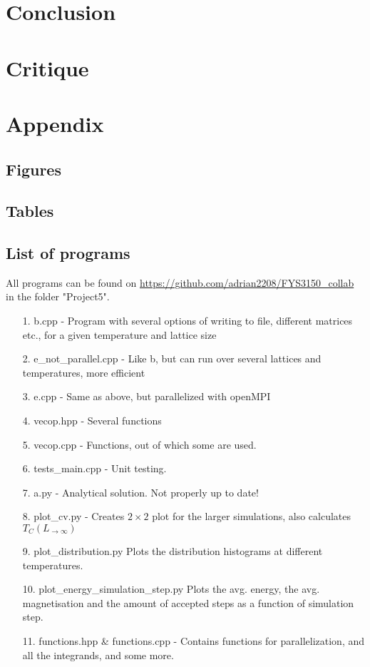 \documentclass[10pt,a4paper]{article}
\begin{document}
\section{Conclusion}

\section{Critique}

\section{Appendix}
\subsection{Figures}

\subsection{Tables}

\subsection{List of programs}
All programs can be found on \url{https://github.com/adrian2208/FYS3150_collab} in the folder "Project5".


\begin{itemize}
\item[1.] b.cpp - Program with several options of writing to file, different matrices etc., for a given temperature and lattice size
\item[2.] e\_not\_parallel.cpp - Like b, but can run over several lattices and temperatures, more efficient
\item[3.] e.cpp - Same as above, but parallelized with openMPI
\item[4.] vecop.hpp - Several functions
\item[5.] vecop.cpp - Functions, out of which some are used.
\item[6.] tests\_main.cpp - Unit testing.
\item[7.] a.py - Analytical solution. Not properly up to date!
\item[8.] plot\_cv.py - Creates $2\times2$ plot for the larger simulations, also calculates $T_C(L_{\rightarrow \infty})$
\item[9.] plot\_distribution.py Plots the distribution histograms at different temperatures.
\item[10.] plot\_energy\_simulation\_step.py Plots the  avg. energy, the avg. magnetisation and the amount of accepted steps as a function of simulation step.
\item[11.] functions.hpp \& functions.cpp - Contains functions for parallelization, and all the integrands, and some more.
\end{itemize}
\end{document}
